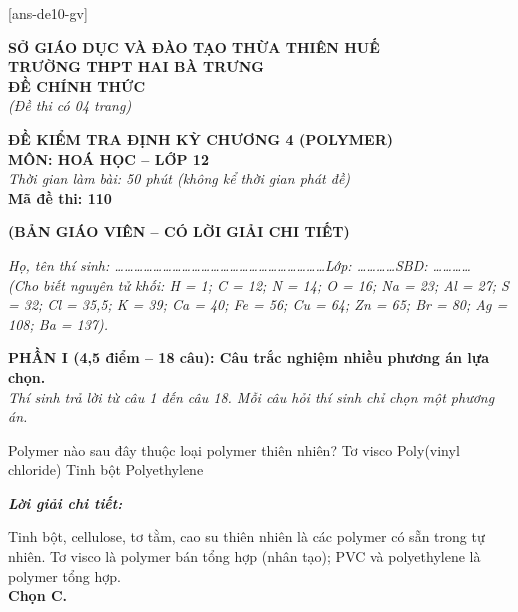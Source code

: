 \documentclass[11pt,a4paper]{article}
\def\loigiai#1{
\par\begingroup\color{blue!80!black}\small
\noindent\textbf{\textit{Lời giải chi tiết:}}\par
#1\par\endgroup}
\begin{document}
[ans-de10-gv]

\noindent
\begin{minipage}[t]{0.48\textwidth}
	\centering
	\textbf{SỞ GIÁO DỤC VÀ ĐÀO TẠO THỪA THIÊN HUẾ}\\
	\textbf{TRƯỜNG THPT HAI BÀ TRƯNG}\\
	\textbf{ĐỀ CHÍNH THỨC}\\
	\textit{(Đề thi có 04 trang)}
\end{minipage}\hfill
\begin{minipage}[t]{0.48\textwidth}
	\centering
	\textbf{\color{mainGreen}ĐỀ KIỂM TRA ĐỊNH KỲ CHƯƠNG 4 (POLYMER)}\\
	\textbf{MÔN: HOÁ HỌC -- LỚP 12}\\
	\textit{Thời gian làm bài: 50 phút (không kể thời gian phát đề)}\\
	\textbf{Mã đề thi: 110}
\end{minipage}


\vspace{0.1cm}
\begin{center}
	\textbf{\color{hfRed}\Large (BẢN GIÁO VIÊN -- CÓ LỜI GIẢI CHI TIẾT)}
\end{center}

\vspace{0.1cm}
\noindent\textit{Họ, tên thí sinh: \dots\dots\dots\dots\dots\dots\dots\dots\dots\dots\dots\dots\dots\dots\dots\dots\dots\dots\dots\dots\dots\dots Lớp: \dots\dots\dots\dots SBD: \dots\dots\dots\dots}\\
\noindent\textit{(Cho biết nguyên tử khối: H = 1; C = 12; N = 14; O = 16; Na = 23; Al = 27; S = 32; Cl = 35,5; K = 39; Ca = 40; Fe = 56; Cu = 64; Zn = 65; Br = 80; Ag = 108; Ba = 137).}

\vspace{0.15cm}
\noindent
\textbf{PHẦN I (4,5 điểm -- 18 câu): Câu trắc nghiệm nhiều phương án lựa chọn.}\\
\textit{Thí sinh trả lời từ câu 1 đến câu 18. Mỗi câu hỏi thí sinh chỉ chọn một phương án.}

\setcounter{ex}{0}

\begin{ex}
Polymer nào sau đây thuộc loại polymer thiên nhiên?
\choice
{Tơ visco}
{Poly(vinyl chloride)}
{\True Tinh bột}
{Polyethylene}
\loigiai{
Tinh bột, cellulose, tơ tằm, cao su thiên nhiên là các polymer có sẵn trong tự nhiên. Tơ visco là polymer bán tổng hợp (nhân tạo); PVC và polyethylene là polymer tổng hợp.\\
\textbf{Chọn C.}}
\end{ex}
\end{document}
